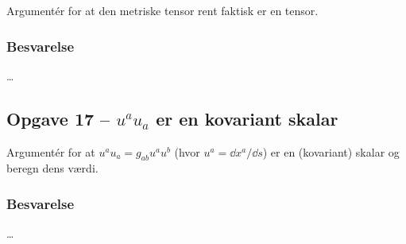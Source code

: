 \documentclass[../main.tex]{subfiles}
\begin{document}
Argumentér for at den metriske tensor rent faktisk er en tensor.


\subsubsection{Besvarelse}

\ldots




\subsection{Opgave 17 -- $u^a u_a$ er en kovariant skalar}
\setcounter{subsection}{17}
\setcounter{equation}{0}

Argumentér for at $u^a u_a = g_{ab} u^a u^b$ (hvor $u^a = \dd x^a / \dd s$) er en (kovariant) skalar og beregn dens værdi.


\subsubsection{Besvarelse}

\ldots



\end{document}
